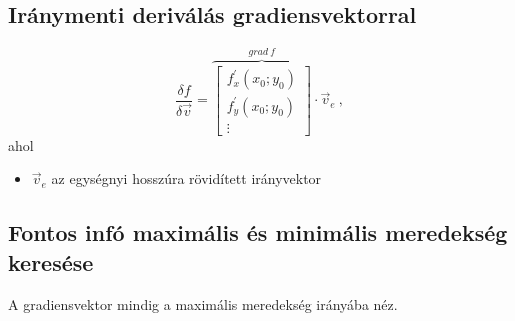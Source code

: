 \documentclass[a4paper,12pt]{article}
\begin{document}
\subsection{Iránymenti deriválás gradiensvektorral}
\begin{equation}
  \frac{\delta f}{\delta \vec{v}} = \overbrace{
    \begin{bmatrix}
      f^{'}_x(x_0;y_0) \\
      f^{'}_y(x_0;y_0) \\
      \vdots
    \end{bmatrix}}^{grad\ f} \cdot \vec{v}_e \ ,
\end{equation}
ahol
\begin{itemize}
\item $\vec{v}_e$ az egységnyi hosszúra rövidített irányvektor
\end{itemize}
\subsection{Fontos infó maximális és minimális meredekség keresése}
A gradiensvektor mindig a maximális meredekség irányába néz.
\end{document}
